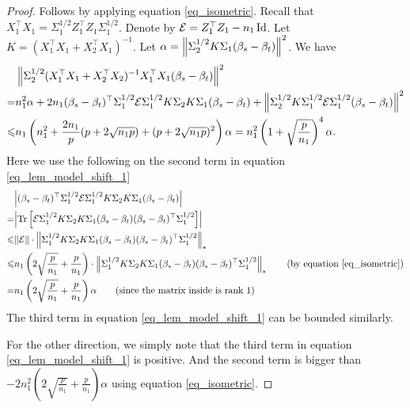 \begin{proof}
	Follows by applying equation \eqref{eq_isometric}.
	Recall that $X_1^{\top}X_1 = \Sigma_1^{1/2}Z_1^{\top}Z_1\Sigma_1^{1/2}$.
	Denote by $\mathcal{E} = Z_1^{\top}Z_1 - {n_1}\operatorname{Id}$.
	Let $K = (X_1^{\top}X_1 + X_2^{\top}X_1)^{-1}$.
	Let $\alpha = \left\| \Sigma_2^{1/2} K \Sigma_1 (\beta_s - \beta_t) \right\|^2$.
	We have
	\begin{align}
		& \left\| \Sigma_2^{1/2}(X_1^{\top}X_1 + X_2^{\top}X_2)^{-1}X_1^{\top}X_1(\beta_s - \beta_t) \right\|^2 \nonumber \\
		= &{n_1^2}{}\alpha + {2n_1}(\beta_s - \beta_t)^{\top}\Sigma_1^{1/2}\mathcal{E}\Sigma_1^{1/2}K \Sigma_2 K \Sigma_1 (\beta_s - \beta_t)
		+ \left\| \Sigma_2^{1/2} K \Sigma_1^{1/2}\mathcal{E} \Sigma_1^{1/2}(\beta_s - \beta_t) \right\|^2 \label{eq_lem_model_shift_1}\\
		\leqslant& n_1\left({{n_1^2}{} + \frac{2n_1}p(p + 2\sqrt{{n_1}p}) + (p + 2\sqrt{{n_1}p})^2}\right) \alpha = n_1^2\left({1 + \sqrt{\frac{p}{n_1}}}\right)^4 \alpha. \nonumber
	\end{align}
	Here we use the following on the second term in equation \eqref{eq_lem_model_shift_1}
	\begin{align*}
		& \bigabs{(\beta_s - \beta_t)^{\top} \Sigma_1^{1/2} \cE \Sigma_1^{1/2} K \Sigma_2 K \Sigma_1 (\beta_s - \beta_t)} \\
		= & \bigabs{\bigtr{\cE \Sigma_1^{1/2}K\Sigma_2 K \Sigma_1(\beta_s - \beta_t)(\beta_s - \beta_t)^{\top} \Sigma_1^{1/2}}} \\
		\le & \norm{\cE} \cdot \bignormNuclear{\Sigma_1^{1/2} K \Sigma_2 K \Sigma_1 (\beta_s - \beta_t) (\beta_s - \beta_t)^{\top} \Sigma_1^{1/2}} \\
		\le & n_1 \bigbrace{2\sqrt{\frac{p}{n_1}} + \frac{p}{n_1}} \cdot \bignormNuclear{\Sigma_1^{1/2} K \Sigma_2 K \Sigma_1 (\beta_s - \beta_t)(\beta_s - \beta_t)^{\top} \Sigma_1^{1/2}} \tag{by equation \eqref{eq_isometric}} \\
		=   & n_1 \bigbrace{2\sqrt{\frac{p}{n_1}} + \frac{p}{n_1}} \alpha \tag{since the matrix inside is rank 1}
	\end{align*}
	The third term in equation \eqref{eq_lem_model_shift_1} can be bounded similarly.

	For the other direction, we simply note that the third term in equation \eqref{eq_lem_model_shift_1} is positive.
	And the second term is bigger than $-2n_1^2(2\sqrt{\frac{p}{n_1}} + \frac{p}{n_1}) \alpha$ using equation \eqref{eq_isometric}.
\end{proof}



